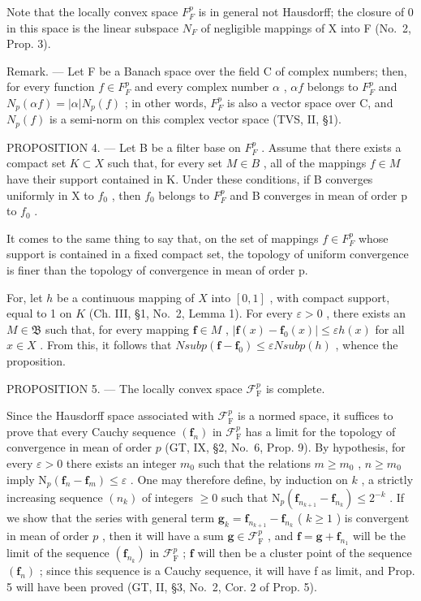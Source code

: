Note that the locally convex space \(F_{F}^{p}\) is in general not Hausdorff; the closure of 0 in this space is the linear subspace \(N_{F}\) of negligible mappings of X into F (No.~2, Prop. 3).

Remark. --- Let F be a Banach space over the field C of complex numbers; then, for every function \(f \in F_{F}^{p}\) and every complex number \(\alpha\) , \(\alpha f\) belongs to \(F_{F}^{p}\) and \(N_{p}(\alpha f) = |\alpha| N_{p}(f)\) ; in other words, \(F_{F}^{p}\) is also a vector space over C, and \(N_{p}(f)\) is a semi-norm on this complex vector space (TVS, II, §1).

PROPOSITION 4. --- Let B be a filter base on \(F_{F}^{p}\) . Assume that there exists a compact set \(K \subset X\) such that, for every set \(M \in B\) , all of the mappings \(f \in M\) have their support contained in K. Under these conditions, if B converges uniformly in X to \(f_{0}\) , then \(f_{0}\) belongs to \(F_{F}^{p}\) and B converges in mean of order p to \(f_{0}\) .

It comes to the same thing to say that, on the set of mappings \(f \in F_{F}^{p}\) whose support is contained in a fixed compact set, the topology of uniform convergence is finer than the topology of convergence in mean of order p.

For, let \(h\) be a continuous mapping of \(X\) into \([0,1]\) , with compact support, equal to 1 on \(K\) (Ch. III, §1, No.~2, Lemma 1). For every \(\varepsilon > 0\) , there exists an \(M \in \mathfrak{B}\) such that, for every mapping \(\mathbf{f} \in M\) , \(|\mathbf{f}(x) - \mathbf{f}_0(x)| \leqslant \varepsilon h(x)\) for all \(x \in X\) . From this, it follows that \(N sub p(\mathbf{f} - \mathbf{f}_0) \leqslant \varepsilon N sub p(h)\) , whence the proposition.

PROPOSITION 5. --- The locally convex space \(\mathcal{F}_{\mathrm{F}}^{p}\) is complete.

Since the Hausdorff space associated with \(\mathcal{F}_{\mathrm{F}}^{p}\) is a normed space, it suffices to prove that every Cauchy sequence \((\mathbf{f}_n)\) in \(\mathcal{F}_{\mathrm{F}}^{p}\) has a limit for the topology of convergence in mean of order \(p\) (GT, IX, §2, No.~6, Prop. 9). By hypothesis, for every \(\varepsilon > 0\) there exists an integer \(m_0\) such that the relations \(m \geqslant m_0\) , \(n \geqslant m_0\) imply \(\mathrm{N}_p(\mathbf{f}_n - \mathbf{f}_m) \leqslant \varepsilon\) . One may therefore define, by induction on \(k\) , a strictly increasing sequence \((n_k)\) of integers \(\geqslant 0\) such that \(\mathrm{N}_p(\mathbf{f}_{n_{k+1}} - \mathbf{f}_{n_k}) \leqslant 2^{-k}\) . If we show that the series with general term \(\mathbf{g}_k = \mathbf{f}_{n_{k+1}} - \mathbf{f}_{n_k}\) ( \(k \geqslant 1\) ) is convergent in mean of order \(p\) , then it will have a sum \(\mathbf{g} \in \mathcal{F}_{\mathrm{F}}^p\) , and \(\mathbf{f} = \mathbf{g} + \mathbf{f}_{n_1}\) will be the limit of the sequence \((\mathbf{f}_{n_k})\) in \(\mathcal{F}_{\mathrm{F}}^p\) ; \(\mathbf{f}\) will then be a cluster point of the sequence \((\mathbf{f}_n)\) ; since this sequence is a Cauchy sequence, it will have f as limit, and Prop. 5 will have been proved (GT, II, §3, No.~2, Cor. 2 of Prop. 5).

